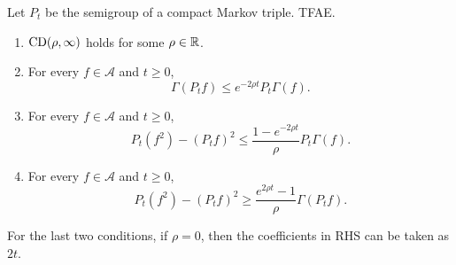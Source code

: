\begin{prop}
    Let $P_t$ be the semigroup of a compact Markov triple. TFAE.
    \begin{enumerate}[label=(\arabic{*})]
    	\item $\operatorname{CD}(\rho,\infty)$ holds for some $\rho \in \mathbb{R}$.
    	\item For every $f \in \mathcal{A}$ and $t \geq 0$,
    	\begin{equation*}
    		\Gamma(P_tf) \leq e^{-2\rho t}P_t \Gamma(f).
    	\end{equation*}
    	\item For every $f \in \mathcal{A}$ and $t \geq 0$,
    	\begin{equation*}
    		P_t(f^2) - (P_tf)^2 \leq \frac{1 - e^{-2\rho t}}{\rho}P_t \Gamma(f).
    	\end{equation*}
    	\item For every $f \in \mathcal{A}$ and $t \geq 0$,
    	\begin{equation*}
    		P_t(f^2) - (P_tf)^2 \geq \frac{e^{2\rho t} - 1}{\rho}\Gamma(P_tf).
    	\end{equation*}
    \end{enumerate}
    For the last two conditions, if $\rho = 0$, then the coefficients in RHS can be taken as $2t$.
\end{prop}

